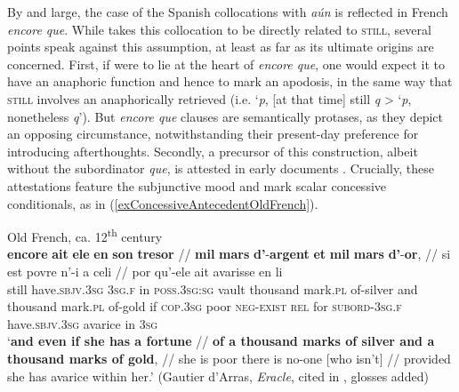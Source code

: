 By and large, the case of the Spanish collocations with \textit{aún} is reflected in French \textit{encore que}.  While \textcite{MosegaardHansen2008} takes this collocation to be directly related to \textsc{still}, several points speak against this assumption, at least as far as its ultimate origins are concerned. First, if  were to lie at the heart of \textit{encore que}, one would expect it to have an anaphoric function and hence to mark an apodosis, in the same way that \textsc{still} involves an anaphorically retrieved  (i.e. \lq \textit{p}, [at that time] still \textit{q} > \lq \textit{p}, nonetheless \textit{q}\rq{}). But \textit{encore que} clauses are semantically protases, as they depict an opposing circumstance, notwithstanding their present-day preference for introducing afterthoughts. Secondly, a precursor of this construction, albeit without the subordinator \textit{que}, is attested in early documents \parencite[197]{MosegaardHansen2008}. Crucially, these attestations feature the subjunctive mood and mark scalar concessive conditionals, as in (\ref{exConcessiveAntecedentOldFrench}). 

\begin{exe}
	\ex Old French, ca. 12\textsuperscript{th} century\label{exConcessiveAntecedentOldFrench}\\
	\gll \textbf{encore} \textbf{ait} \textbf{ele} \textbf{en} \textbf{son} \textbf{tresor} // \textbf{mil} \textbf{mars} \textbf{d’}-\textbf{argent} \textbf{et} \textbf{mil} \textbf{mars} \textbf{d’}-\textbf{or}, // si est povre n’-{i a} celi // por qu’-ele ait avarisse en li\\
	still have.\textsc{sbjv}.3\textsc{sg} 3\textsc{sg}.\textsc{f} in \textsc{poss}.3\textsc{sg}:\textsc{sg} vault {} thousand mark.\textsc{pl} of-silver and thousand mark.\textsc{pl} of-gold { } if \textsc{cop}.3\textsc{sg} poor \textsc{neg}-\textsc{exist} \textsc{rel} {} for \textsc{subord}-3\textsc{sg}.\textsc{f} have.\textsc{sbjv}.3\textsc{sg} avarice in 3\textsc{sg}\\
	\glt \lq \textbf{and even if she has a fortune} // \textbf{of a thousand marks of silver and a thousand marks of gold}, // she is poor there is no-one [who isn’t] // provided she has avarice within her.\rq{ }(Gautier d'Arras, \textit{Eracle}, cited in \cite[197]{MosegaardHansen2008}, glosses added)
\end{exe}

